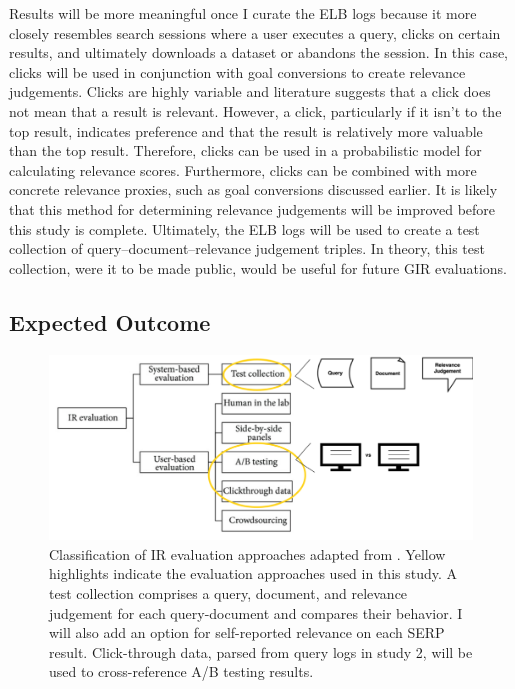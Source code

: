 Results will be more meaningful once I curate the ELB logs because it more closely resembles search sessions where a user executes a query, clicks on certain results, and ultimately downloads a dataset or abandons the session. In this case, clicks will be used in conjunction with goal conversions to create relevance judgements. Clicks are highly variable and literature suggests that a click does not mean that a result is relevant. However, a click, particularly if it isn’t to the top result, indicates preference and that the result is relatively more valuable than the top result. Therefore, clicks can be used in a probabilistic model for calculating relevance scores. Furthermore, clicks can be combined with more concrete relevance proxies, such as goal conversions discussed earlier. It is likely that this method for determining relevance judgements will be improved before this study is complete. Ultimately, the ELB logs will be used to create a test collection of query–document–relevance judgement triples. In theory, this test collection, were it to be made public, would be useful for future GIR evaluations.

\subsection{Expected Outcome}

\begin{figure}[H]
    \centering
    \includegraphics[width=1\textwidth]{../figures/Methods_Evaluation.png}
    \caption{Classification of IR evaluation approaches adapted from \cite{Samimi2014}. Yellow highlights indicate the evaluation approaches used in this study. A test collection comprises a query, document, and relevance judgement for each query-document and compares their behavior. I will also add an option for self-reported relevance on each SERP result. Click-through data, parsed from query logs in study 2, will be used to cross-reference A/B testing results.}
    \label{fig:Methods_Evaluation}
\end{figure}